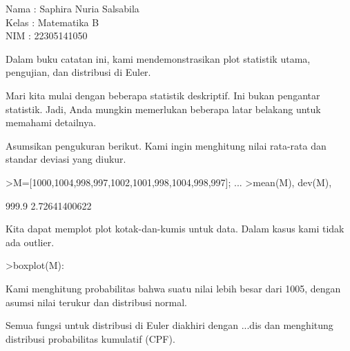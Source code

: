 \documentclass{article}
\begin{document}
\begin{eulernotebook}
\begin{eulercomment}
Nama  : Saphira Nuria Salsabila\\
Kelas : Matematika B\\
NIM   : 22305141050

\begin{eulercomment}
\begin{eulercomment}
Dalam buku catatan ini, kami mendemonstrasikan plot statistik utama,
pengujian, dan distribusi di Euler.

Mari kita mulai dengan beberapa statistik deskriptif. Ini bukan
pengantar statistik. Jadi, Anda mungkin memerlukan beberapa latar
belakang untuk memahami detailnya.

Asumsikan pengukuran berikut. Kami ingin menghitung nilai rata-rata
dan standar deviasi yang diukur.
\end{eulercomment}
\begin{eulerprompt}
>M=[1000,1004,998,997,1002,1001,998,1004,998,997]; ...
>mean(M), dev(M),
\end{eulerprompt}
\begin{euleroutput}
  999.9
  2.72641400622
\end{euleroutput}
\begin{eulercomment}
Kita dapat memplot plot kotak-dan-kumis untuk data. Dalam kasus kami
tidak ada outlier.
\end{eulercomment}
\begin{eulerprompt}
>boxplot(M):
\end{eulerprompt}
\begin{eulercomment}
Kami menghitung probabilitas bahwa suatu nilai lebih besar dari 1005,
dengan asumsi nilai terukur dan distribusi normal.

Semua fungsi untuk distribusi di Euler diakhiri dengan ...dis dan
menghitung distribusi probabilitas kumulatif (CPF).


\end{eulercomment}
\end{eulercomment}
\end{eulercomment}
\end{eulernotebook}
\end{document}
